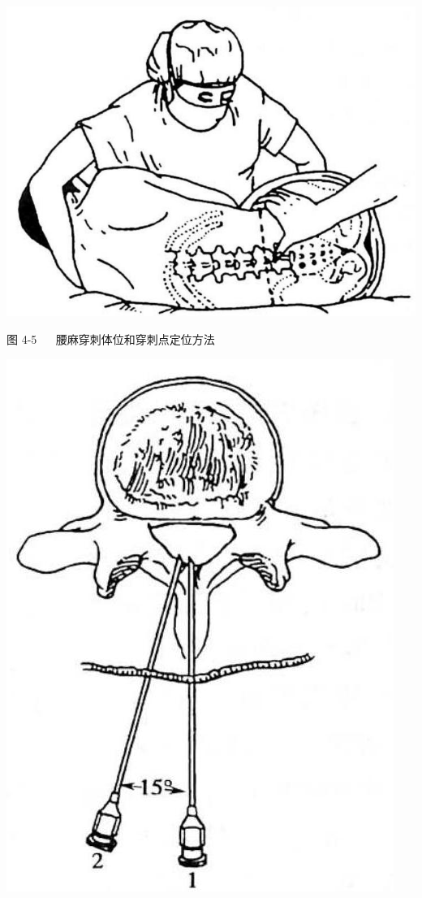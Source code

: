\documentclass[10pt]{article}
\begin{document}
\begin{center}
\includegraphics[max width=\textwidth]{2024_07_09_002a177993bd97d1d6d7g-062(1)}
\end{center}

图 4-5 $\quad$ 腰麻穿刺体位和穿刺点定位方法

\begin{center}
\includegraphics[max width=\textwidth]{2024_07_09_002a177993bd97d1d6d7g-062}
\end{center}
\end{document}
